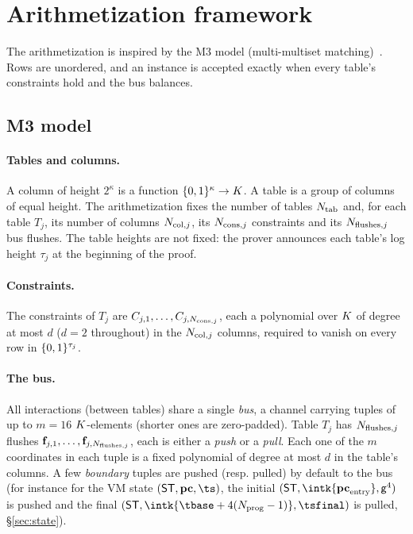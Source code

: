 \section{Arithmetization framework}\label{sec:arith}

The arithmetization is inspired by the M3 model (multi-multiset matching)~\cite{m3}. Rows are unordered, and an instance is accepted exactly when every table's constraints hold and the bus balances.

\subsection{M3 model}\label{sec:m3}

\paragraph{Tables and columns.} A column of height $2^{\kappa}$ is a function $\{0,1\}^{\kappa}\to K$. A table is a group of columns of equal height. The arithmetization fixes the number of tables $N_{\mathrm{tab}}$ and, for each table $T_j$, its number of columns $N_{\mathrm{col},j}$, its $N_{\mathrm{cons},j}$ constraints and its $N_{\mathrm{flushes},j}$ bus flushes. The table heights are not fixed: the prover announces each table's log height $\tau_j$ at the beginning of the proof.

\paragraph{Constraints.} The constraints of $T_j$ are $C_{j,1},\dots,C_{j,N_{\mathrm{cons},j}}$, each a polynomial over $K$ of degree at most $d$ ($d=2$ throughout) in the $N_{\mathrm{col},j}$ columns, required to vanish on every row in $\{0,1\}^{\tau_j}$.

\paragraph{The bus.} All interactions (between tables) share a single \emph{bus}, a channel carrying tuples of up to $m=16$ $K$-elements (shorter ones are zero-padded). Table $T_j$ has $N_{\mathrm{flushes},j}$ flushes $\mathbf{f}_{j,1},\dots,\mathbf{f}_{j,N_{\mathrm{flushes},j}}$, each is either a \emph{push} or a \emph{pull}. Each one of the $m$ coordinates in each tuple is a fixed polynomial of degree at most $d$ in the table's columns. A few \emph{boundary} tuples are pushed (resp. pulled) by default to the bus (for instance for the VM state $(\dsep{ST}, \pc, \ts)$, the initial $(\dsep{ST}, \intk{\pc_{\mathrm{entry}}}, \gen^{4})$ is pushed and the final $(\dsep{ST}, \intk{\tbase+4(\nprog-1)}, \tsfinal)$ is pulled, \S\ref{sec:state}).

